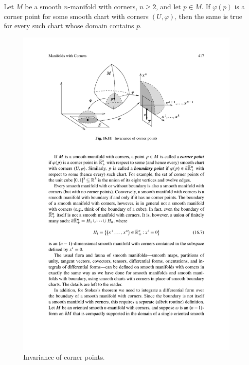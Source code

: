 \begin{proposition}
Let $M$ be a smooth $n$-manifold with corners, $n\geq 2$, and let $p\in M$. If $\varphi(p)$ is a corner point for some smooth chart with corners $(U,\varphi)$, then the same is true for every such chart whose domain contains $p$.
\end{proposition}
\begin{figure}[htbp]
\centering
\includegraphics{pictures/inv-corner}
\caption{Invariance of corner points.}
\end{figure}
